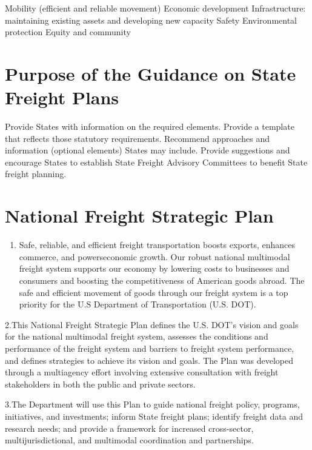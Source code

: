 \documentclass[
]{book}
\providecommand{\tightlist}{%
  \setlength{\itemsep}{0pt}\setlength{\parskip}{0pt}}
\begin{document}
Mobility (efficient and reliable movement)
Economic development
Infrastructure: maintaining existing assets and developing new capacity
Safety
Environmental protection
Equity and community

\hypertarget{planning-guidance}{%
\section{Purpose of the Guidance on State Freight Plans}\label{planning-guidance}}

Provide States with information on the required elements.
Provide a template that reflects those statutory requirements.
Recommend approaches and information (optional elements) States may include.
Provide suggestions and encourage States to establish
State Freight Advisory Committees to benefit State freight planning.

\hypertarget{planning-strategicplan}{%
\section{National Freight Strategic Plan}\label{planning-strategicplan}}

\begin{enumerate}
\def\labelenumi{\arabic{enumi}.}
\tightlist
\item
  Safe, reliable, and efficient freight transportation boosts exports, enhances commerce, and powerseconomic growth. Our robust national multimodal freight system supports our economy by lowering costs to businesses and consumers and boosting the competitiveness of American goods abroad. The safe and efficient movement of goods through our freight system is a top priority for the U.S Department of Transportation (U.S. DOT).
\end{enumerate}

2.This National Freight Strategic Plan defines the U.S. DOT's vision and goals for the national multimodal freight system, assesses the conditions and performance of the freight system and barriers to freight system performance, and defines strategies to achieve its vision and goals. The Plan was developed through a multiagency effort involving extensive consultation with freight stakeholders in both the public and private sectors.

3.The Department will use this Plan to guide national freight policy, programs, initiatives, and investments; inform State freight plans; identify freight data and research needs; and provide a framework for increased cross-sector, multijurisdictional, and multimodal coordination and partnerships.
\end{document}
